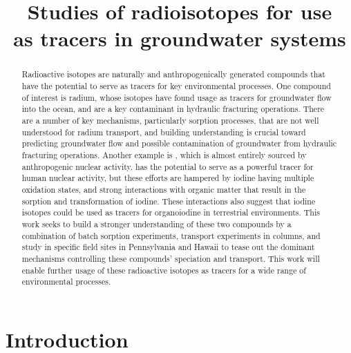 \documentclass[twoside,12pt,titlepage]{article}
\title{Studies of radioisotopes for use \\as tracers in groundwater systems}
\author{\machen}
\newcommand{\isotope}[2]{\ch{^{#1}#2}}
\begin{document}
\maketitle
\thispagestyle{plain}

\begin{abstract}
Radioactive isotopes are naturally and anthropogenically generated compounds that have the potential to serve as tracers for key environmental processes. One compound of interest is radium, whose isotopes have found usage as tracers for groundwater flow into the ocean, and are a key contaminant in hydraulic fracturing operations. There are a number of key mechanisms, particularly sorption processes, that are not well understood for radium transport, and building understanding is crucial toward predicting groundwater flow and possible contamination of groundwater from hydraulic fracturing operations. Another example is \isotope{129}{I}, which is almost entirely sourced by anthropogenic nuclear activity. \isotope{129}{I} has the potential to serve as a powerful tracer for human nuclear activity, but these efforts are hampered by iodine having multiple oxidation states, and strong interactions with organic matter that result in the sorption and transformation of iodine. These interactions also suggest that iodine isotopes could be used as tracers for organoiodine in terrestrial environments. This work seeks to build a stronger understanding of these two compounds by a combination of batch sorption experiments, transport experiments in columns, and study in specific field sites in Pennsylvania and Hawaii to tease out the dominant mechanisms controlling these compounds' speciation and transport. This work will enable further usage of these radioactive isotopes as tracers for a wide range of environmental processes.
\end{abstract}

\section{Introduction}
\end{document}
